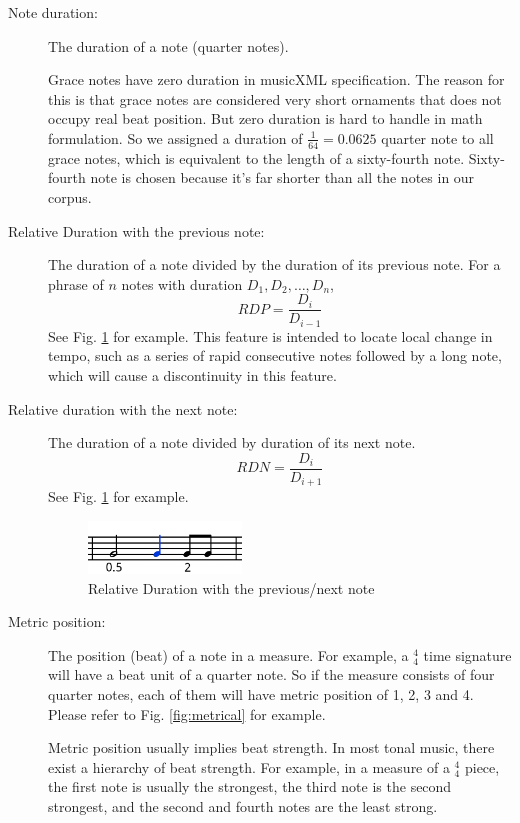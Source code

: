 \begin{description}
         
         \item [Note duration:] The duration of a note (quarter notes). 

            Grace notes have zero duration in musicXML specification. The reason for this is that grace notes are considered very short ornaments that does not occupy real beat position. But zero duration is hard to handle in math formulation. So we assigned a duration of $\frac{1}{64} = 0.0625$ quarter note to all grace notes, which is equivalent to the length of a sixty-fourth note. Sixty-fourth note is chosen because it's far shorter than all the notes in our corpus.
         \item [Relative Duration with the previous note:] The duration of a note divided by the duration of its previous note. For a phrase of $n$ notes with duration $D_1, D_2, \dots, D_n$, $$RDP = \frac{D_i}{D_{i-1}} $$ See Fig. \ref{fig:duration} for example.
            This feature is intended to locate local change in tempo, such as a series of rapid consecutive notes followed by a long note, which will cause a discontinuity in this feature.
         \item [Relative duration with the next note:] The duration of a note divided by duration of its next note. $$RDN = \frac{D_i}{D_{i+1}} $$ See Fig. \ref{fig:duration} for example.

      \begin{figure}[tp]
         \begin{center}
            \includegraphics[width=0.4\textwidth]{fig/duration}
         \end{center}
         \caption{Relative Duration with the previous/next note}
         \label{fig:duration}
      \end{figure}
   \item [Metric position:] The position (beat) of a note in a measure. For example, a $^4_4$ time signature will have a beat unit of a quarter note. So if the measure consists of four quarter notes, each of them will have metric position of 1, 2, 3 and 4. Please refer to Fig. \ref{fig:metrical} for example.
      
      Metric position usually implies beat strength. In most tonal music, there exist a hierarchy of beat strength. For example, in a measure of a $^4_4$ piece, the first note is usually the strongest, the third note is the second strongest, and the second and fourth notes are the least strong.


\end{description}
